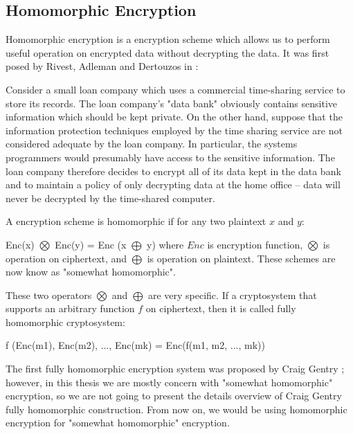      
    
    \subsection{Homomorphic Encryption}
	     Homomorphic encryption  is a encryption scheme which allows us to perform useful operation on 
	     encrypted data without decrypting the data. It was first posed by Rivest, Adleman and Dertouzos in \citep{rivest1978data}: 
	     \begin{displayquote}
	     
	     Consider a small loan company which uses a commercial time-sharing service to store its records.  
	     The loan company’s "data bank" obviously contains sensitive information which should be kept private.  
	     On the other hand, suppose that the information protection techniques employed by the time sharing 
	     service are not considered adequate by the loan company.  In particular, the systems programmers would 
	     presumably have access to the sensitive information.  The loan company therefore decides to encrypt all 
	     of its data kept in the data bank and to maintain a policy of only decrypting data at the home office -- data 
	     will never be decrypted by the time-shared computer.
	     
	     \end{displayquote}  
	     
		A encryption scheme is homomorphic if for any two plaintext $x$ and $y$:
		\begin{displayquote}
		
		Enc(x) $\bigotimes$ Enc(y) = Enc (x $\bigoplus$ y) where 
		$Enc$ is encryption function, $\bigotimes$ is operation on ciphertext, and $\bigoplus$
		is operation on plaintext. These schemes are now know as "somewhat homomorphic". 
		
		\end{displayquote}
				
		These two operators $\bigotimes$ and $\bigoplus$ are very specific. If a cryptosystem that supports an arbitrary 
		function $f$ on ciphertext, then it is called fully homomorphic cryptosystem:
		\begin{displayquote}
		f (Enc(m1), Enc(m2), ..., Enc(mk) = Enc(f(m1, m2, ..., mk)) 
	    \end{displayquote}
		
		\noindent
		The first fully homomorphic encryption system was proposed by Craig Gentry \citep{Gentry:2009:FHE:1834954}; however, 
		in this thesis we are mostly concern with "somewhat homomorphic" encryption, so we are not going to present the details overview 
		of Craig Gentry fully homomorphic construction. From now on, we would be using homomorphic encryption for 
		 "somewhat homomorphic" encryption. 
		 	    
